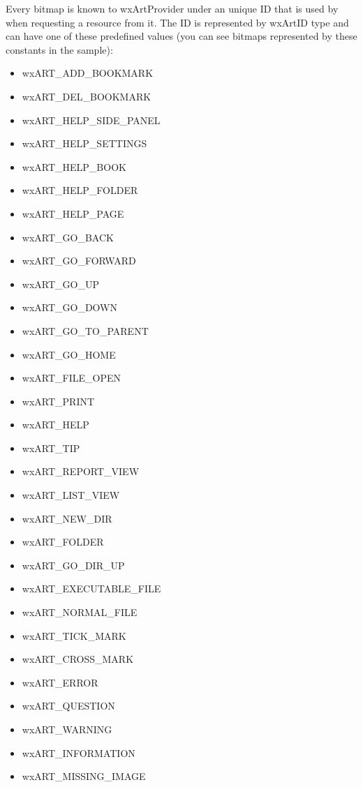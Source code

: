 Every bitmap is known to wxArtProvider under an unique ID that is used by when
requesting a resource from it. The ID is represented by wxArtID type and can
have one of these predefined values (you can see bitmaps represented by these
constants in the  sample):
\begin{itemize}\itemsep=0pt
\item wxART\_ADD\_BOOKMARK     
\item wxART\_DEL\_BOOKMARK     
\item wxART\_HELP\_SIDE\_PANEL  
\item wxART\_HELP\_SETTINGS    
\item wxART\_HELP\_BOOK        
\item wxART\_HELP\_FOLDER      
\item wxART\_HELP\_PAGE        
\item wxART\_GO\_BACK          
\item wxART\_GO\_FORWARD       
\item wxART\_GO\_UP            
\item wxART\_GO\_DOWN          
\item wxART\_GO\_TO\_PARENT     
\item wxART\_GO\_HOME          
\item wxART\_FILE\_OPEN        
\item wxART\_PRINT            
\item wxART\_HELP             
\item wxART\_TIP              
\item wxART\_REPORT\_VIEW      
\item wxART\_LIST\_VIEW        
\item wxART\_NEW\_DIR          
\item wxART\_FOLDER           
\item wxART\_GO\_DIR\_UP        
\item wxART\_EXECUTABLE\_FILE  
\item wxART\_NORMAL\_FILE      
\item wxART\_TICK\_MARK        
\item wxART\_CROSS\_MARK       
\item wxART\_ERROR            
\item wxART\_QUESTION         
\item wxART\_WARNING          
\item wxART\_INFORMATION      
\item wxART\_MISSING\_IMAGE      
\end{itemize}

